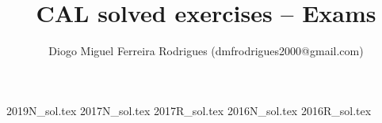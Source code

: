 \documentclass{cal}
\title{CAL solved exercises -- Exams}
\author{Diogo Miguel Ferreira Rodrigues (dmfrodrigues2000@gmail.com)}
\date{}
\begin{document}
\frontmatter
\begingroup
\maketitle
    \let\clearpage\relax
	\tableofcontents
\endgroup
\mainmatter
{2019N_sol.tex}
{2017N_sol.tex}
{2017R_sol.tex}
{2016N_sol.tex}
{2016R_sol.tex}
\end{document}
